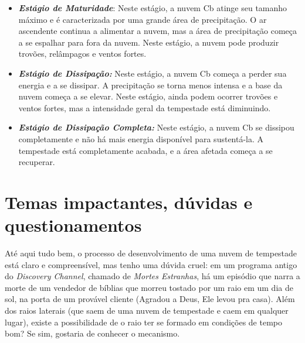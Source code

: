 \documentclass[a4paper, 12pt, onecolumn,singlespacing]{article}
\begin{document}
\begin{itemize}
\begin{itemize}
			\item \textbf{\textit{Estágio de Maturidade}}: Neste estágio, a nuvem Cb atinge seu tamanho máximo e é caracterizada por uma grande área de precipitação. O ar ascendente continua a alimentar a nuvem, mas a área de precipitação começa a se espalhar para fora da nuvem. Neste estágio, a nuvem pode produzir trovões, relâmpagos e ventos fortes.
			
			\item \textbf{\textit{Estágio de Dissipação:}} Neste estágio, a nuvem Cb começa a perder sua energia e a se dissipar. A precipitação se torna menos intensa e a base da nuvem começa a se elevar. Neste estágio, ainda podem ocorrer trovões e ventos fortes, mas a intensidade geral da tempestade está diminuindo.
			
			\item \textbf{\textit{Estágio de Dissipação Completa:}} Neste estágio, a nuvem Cb se dissipou completamente e não há mais energia disponível para sustentá-la. A tempestade está completamente acabada, e a área afetada começa a se recuperar.
		\end{itemize}
	
	\end{itemize}
	\section{Temas impactantes, dúvidas e questionamentos}
	
	Até aqui tudo bem, o processo de desenvolvimento de uma nuvem de tempestade está claro e compreensível, mas tenho uma dúvida cruel: em um programa antigo do \textit{Discovery Channel}, chamado de \textit{Mortes Estranhas}, há um episódio que narra a morte de um vendedor de bíblias que morreu tostado por um raio em um dia de sol, na porta de um provável cliente (Agradou a Deus, Ele levou pra casa). Além dos raios laterais (que saem de uma nuvem de tempestade e caem em qualquer lugar), existe a possibilidade de o raio ter se formado em condições de tempo bom? Se sim, gostaria de conhecer o mecanismo.
	
\end{document}
